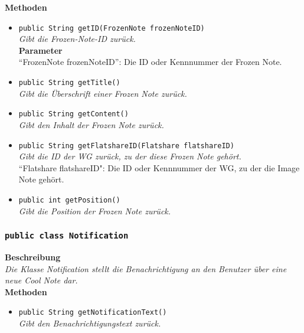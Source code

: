 	\textbf{Methoden}
	\begin{itemize}
		\item\texttt{{public String getID(FrozenNote frozenNoteID)}}\\
		\textit{Gibt die Frozen-Note-ID zurück.}\\
		\textbf{Parameter}\\
		“FrozenNote frozenNoteID”: Die ID oder Kennnummer der Frozen Note.\\
		
		\item\texttt{{public String getTitle()}}\\
		\textit{Gibt die Überschrift einer Frozen Note zurück.}\\
		
		\item\texttt{{public String getContent()}}\\
		\textit{Gibt den Inhalt der Frozen Note zurück.}\\
		
		\item\texttt{{public String getFlatshareID(Flatshare flatshareID)}}\\
		\textit{Gibt die ID der WG zurück, zu der diese Frozen Note gehört.}\\
		``Flatshare flatshareID": Die ID oder Kennnummer der WG, zu der die Image Note gehört.
		
		\item\texttt{{public int getPosition()}}\\
		\textit{Gibt die Position der Frozen Note zurück.}\\
	\end{itemize}

\subsubsection{\texttt{public class Notification}}

	\textbf{Beschreibung} \\
	\textit{Die Klasse Notification stellt die Benachrichtigung an den Benutzer über eine neue Cool Note dar.} \\
	
	\textbf{Methoden}
	\begin{itemize}
		\item\texttt{{public String getNotificationText()}}\\
		\textit{Gibt den Benachrichtigungstext zurück.}\\
	\end{itemize}

